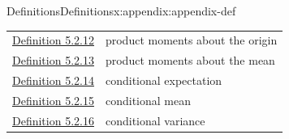 \documentclass[oneside,10pt,]{book}
\numberwithin{equation}{section}
\begin{document}
\begin{appendixptx}{Definitions}{}{Definitions}{}{}{x:appendix:appendix-def}
\begin{longtable}[l]{ll}
\hyperref[x:definition:def-product-moments-origin-4-7-cont]{Definition 5.2.12}& product moments about the origin\\
\hyperref[x:definition:def-product-moments-mean-4-8-cont]{Definition 5.2.13}& product moments about the mean\\
\hyperref[x:definition:def-conditional-expectation-4-10]{Definition 5.2.14}& conditional expectation\\
\hyperref[x:definition:def-conditional-mean]{Definition 5.2.15}& conditional mean\\
\hyperref[x:definition:def-conditional-variance]{Definition 5.2.16}& conditional variance\\
\end{longtable}
\end{appendixptx}
%
%
\typeout{************************************************}
\typeout{************************************************}
%
\end{document}
